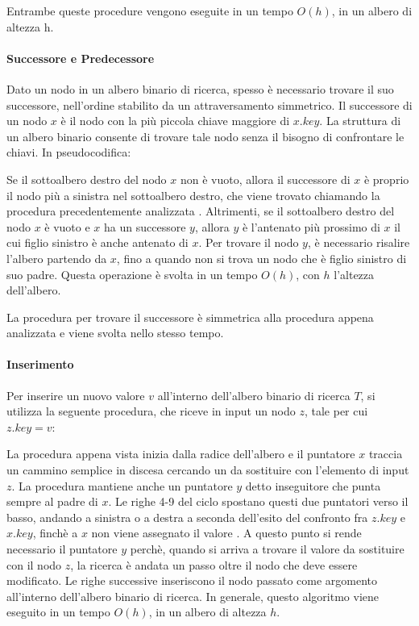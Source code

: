 

Entrambe queste procedure vengono eseguite in un tempo \(O(h)\), in un albero di altezza h. 

\paragraph{Successore e Predecessore}
Dato un nodo in un albero binario di ricerca, spesso è necessario trovare il suo successore, nell'ordine stabilito da un attraversamento simmetrico. Il successore di un nodo \(x\) è il nodo con la più piccola chiave maggiore di \(x.key\). La struttura di un albero binario consente di trovare tale nodo senza il bisogno di confrontare le chiavi. In pseudocodifica:



Se il sottoalbero destro del nodo \(x\) non è vuoto, allora il successore di \(x\) è proprio il nodo più a sinistra nel sottoalbero destro, che viene trovato chiamando la procedura precedentemente analizzata . Altrimenti, se il sottoalbero destro del nodo \(x\) è vuoto e \(x\) ha un successore \(y\), allora \(y\) è l'antenato più prossimo di \(x\) il cui figlio sinistro è anche antenato di \(x\). Per trovare il nodo \(y\), è necessario risalire l'albero partendo da \(x\), fino a quando non si trova un nodo che è figlio sinistro di suo padre. Questa operazione è svolta in un tempo \(O(h)\), con \(h\) l'altezza dell'albero. 

La procedura per trovare il successore è simmetrica alla procedura appena analizzata e viene svolta nello stesso tempo. 

\paragraph{Inserimento}
Per inserire un nuovo valore \(v\) all'interno dell'albero binario di ricerca \(T\), si utilizza la seguente procedura, che riceve in input un nodo \(z\), tale per cui \(z.key = v\):



La procedura appena vista inizia dalla radice dell'albero e il puntatore \(x\) traccia un cammino semplice in discesa cercando un  da sostituire con l'elemento di input \(z\). La procedura mantiene anche un puntatore \(y\) detto inseguitore che punta sempre al padre di \(x\). Le righe 4-9 del ciclo  spostano questi due puntatori verso il basso, andando a sinistra o a destra a seconda dell'esito del confronto fra \({z.key}\) e \(x.key\), finchè a \(x\) non viene assegnato il valore . A questo punto si rende necessario il puntatore \(y\) perchè, quando si arriva a trovare il valore  da sostituire con il nodo \(z\), la ricerca è andata un passo oltre il nodo che deve essere modificato. Le righe successive inseriscono il nodo passato come argomento all'interno dell'albero binario di ricerca. In generale, questo algoritmo viene eseguito in un tempo \(O(h)\), in un albero di altezza \(h\).

